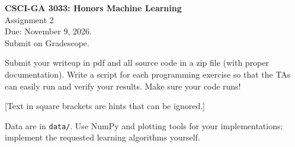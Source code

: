 \documentclass[10pt,letterpaper]{article}
\begin{document}
\begin{center}
\large{\textbf{CSCI-GA 3033: Honors Machine Learning} \\ Assignment 2\\ Due: November 9, 2026.\\ Submit on Gradescope.}
\end{center}
\begin{center}
Submit your writeup in pdf and all source code in a zip file (with proper documentation). Write a script for each programming exercise so that the TAs can easily run and verify your results. Make sure your code runs!

[Text in square brackets are hints that can be ignored.]
\end{center}
\noindent Data are in \texttt{data/}. Use NumPy and plotting tools for your implementations; implement the requested learning algorithms yourself.
\end{document}
